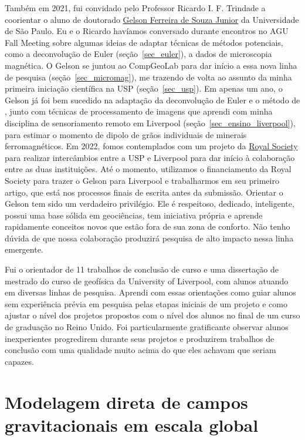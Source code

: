 \documentclass[10pt,a4paper,oneside]{book}
\begin{document}
Também em 2021, fui convidado pelo Professor Ricardo I. F. Trindade a
coorientar o aluno de doutorado
\href{https://www.compgeolab.org/team/#Souza-junior}{Gelson Ferreira de Souza Junior}
da Universidade de São Paulo.
Eu e o Ricardo havíamos conversado durante encontros no AGU Fall Meeting sobre
algumas ideias de adaptar técnicas de métodos potenciais, como a deconvolução
de Euler (seção~\ref{sec_euler}), a dados de microscopia magnética.
O Gelson se juntou ao CompGeoLab para dar início a essa nova linha de pesquisa
(seção~\ref{sec_micromag}), me trazendo de volta ao assunto da minha primeira
iniciação científica na USP (seção~\ref{sec_usp}).
Em apenas um ano, o Gelson já foi bem sucedido na adaptação da deconvolução de
Euler e o método de \citet{OliveiraJr2015}, junto com técnicas de processamento
de imagens que aprendi com minha disciplina de sensoriamento remoto em
Liverpool (seção~\ref{sec_ensino_liverpool}), para estimar o momento de dipolo
de grãos individuais de minerais ferromagnéticos.
Em 2022, fomos contemplados com um projeto da
\href{https://royalsociety.org/}{Royal Society} para realizar intercâmbios
entre a USP e Liverpool para dar início à colaboração entre as duas
instituições.
Até o momento, utilizamos o financiamento da Royal Society para trazer o Gelson
para Liverpool e trabalharmos em seu primeiro artigo, que está nos processos
finais de escrita antes da submissão.
Orientar o Gelson tem sido um verdadeiro privilégio.
Ele é respeitoso, dedicado, inteligente, possui uma base sólida em geociências,
tem iniciativa própria e aprende rapidamente conceitos novos que estão fora de
sua zona de conforto.
Não tenho dúvida de que nossa colaboração produzirá pesquisa de alto impacto
nessa linha emergente.

Fui o orientador de 11 trabalhos de conclusão de curso e uma dissertação de
mestrado do curso de geofísica da University of Liverpool, com alunos
atuando em diversas linhas de pesquisa.
Aprendi com essas orientações como guiar alunos sem experiência prévia em
pesquisa pelas etapas iniciais de um projeto e como ajustar o nível dos
projetos propostos com o nível dos alunos no final de um curso de graduação no
Reino Unido.
Foi particularmente gratificante observar alunos inexperientes progredirem
durante seus projetos e produzirem trabalhos de conclusão com uma qualidade
muito acima do que eles achavam que seriam capazes.

\section{Modelagem direta de campos gravitacionais em escala global}
\label{sec_modelagemdireta}
\end{document}
